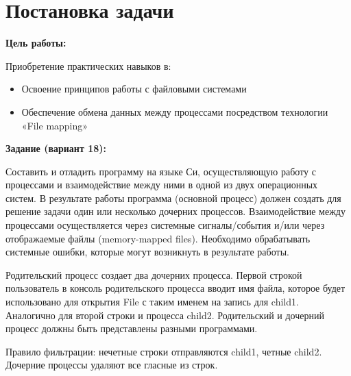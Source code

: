 \section{Постановка задачи}

{\bfseries Цель работы:} 

Приобретение практических навыков в:

\begin{itemize}
    \item Освоение принципов работы с файловыми системами
    \item Обеспечение обмена данных между процессами посредством технологии «File mapping»
\end{itemize}

{\bfseries Задание (вариант 18):} 

Составить и отладить программу на языке Си, осуществляющую работу с процессами и взаимодействие между ними в одной из двух операционных систем. В результате работы программа (основной процесс) должен создать для решение задачи
один или несколько дочерних процессов. Взаимодействие между процессами осуществляется через системные сигналы/события и/или через отображаемые файлы (memory-mapped files). Необходимо обрабатывать системные ошибки, которые могут
возникнуть в результате работы.

Родительский процесс создает два дочерних процесса. Первой строкой пользователь в консоль родительского процесса вводит имя файла, которое будет использовано для открытия File с таким именем на запись для child1. Аналогично для второй строки и процесса child2. Родительский и дочерний процесс должны быть представлены разными программами.

Правило фильтрации: нечетные строки отправляются child1, четные child2. Дочерние процессы удаляют все гласные из строк.

\pagebreak
